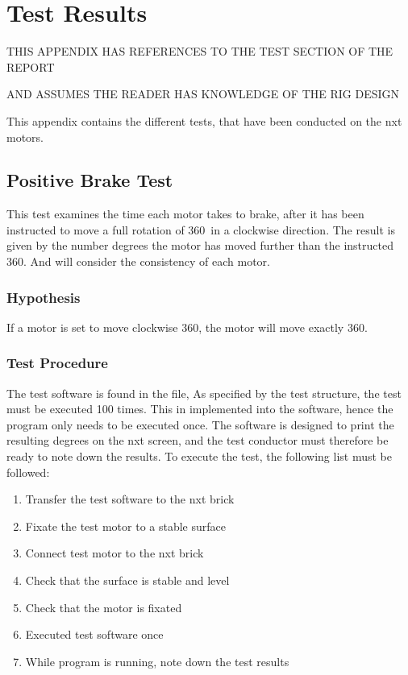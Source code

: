 \chapter{Test Results}

THIS APPENDIX HAS REFERENCES TO THE TEST SECTION OF THE REPORT

AND ASSUMES THE READER HAS KNOWLEDGE OF THE RIG DESIGN

This appendix contains the different tests, that have been conducted on the \gls{nxt} motors.

\section{Positive Brake Test}
This test examines the time each motor takes to brake, after it has been instructed to move a full rotation of 360\degree\ in a clockwise direction. The result is given by the number degrees the motor has moved further than the instructed 360\degree . And will consider the consistency of each motor.

\subsection{Hypothesis} If a motor is set to move clockwise 360\degree , the motor will move exactly 360\degree .

\subsection{Test Procedure}
The test software is found in the file,  As specified by the test structure, the test must be executed 100 times. This in implemented into the software, hence the program only needs to be executed once.
The software is designed to print the resulting degrees on  the \gls{nxt} screen, and the test conductor must therefore be ready to note down the results. To execute the test, the following list must be followed:
\begin{enumerate}
  \item Transfer the test software to the \gls{nxt} brick
  \item Fixate the test motor to a stable surface
  \item Connect test motor to the \gls{nxt} brick
  \item Check that the surface is stable and level
  \item Check that the motor is fixated
  \item Executed test software once
  \item While program is running, note down the test results
\end{enumerate}

